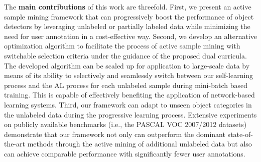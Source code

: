 \documentclass[journal]{IEEEtran}
\begin{document}


The \textbf{main contributions} of this work are threefold. First, we present an {active sample mining} framework that can progressively boost the performance of object detectors by leveraging unlabeled or partially labeled data while minimizing the need for user annotation in a {cost-effective} way. Second, we develop an alternative optimization algorithm to facilitate the process of active sample mining with switchable selection criteria under the guidance of the proposed dual curricula. The developed algorithm can be scaled up for application to large-scale data by means of its ability to {selectively} and seamlessly switch between our self-learning process and the AL process for each unlabeled sample during mini-batch based training. {This is capable of effectively benefiting the application of network-based learning systems}. Third, our framework can adapt to unseen object categories in the unlabeled data during the progressive learning process. Extensive experiments on publicly available benchmarks (i.e., the PASCAL VOC 2007/2012 datasets) demonstrate that our framework not only can outperform the dominant state-of-the-art methods through {the active mining of} additional unlabeled data but also can achieve comparable performance with significantly fewer user annotations. 
\end{document}
